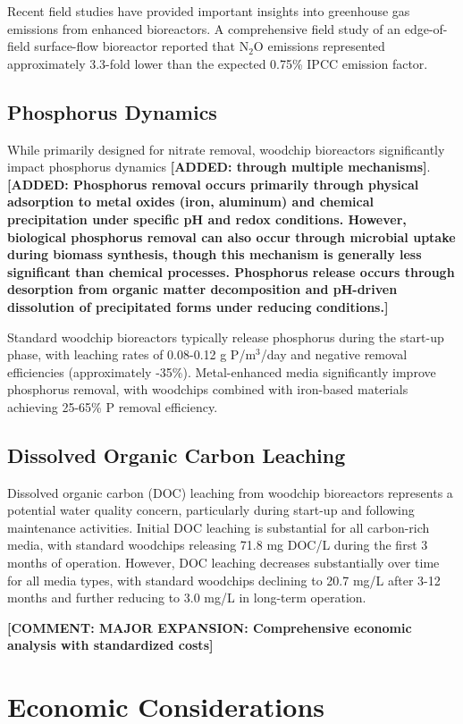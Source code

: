 \documentclass[12pt,a4paper]{article}
\newcommand{\added}[1]{\textcolor{addedtext}{\textbf{[ADDED: #1]}}}
\newcommand{\comment}[1]{\textcolor{commenttext}{\textbf{[COMMENT: #1]}}}
\begin{document}
Recent field studies have provided important insights into greenhouse gas emissions from enhanced bioreactors. A comprehensive field study of an edge-of-field surface-flow bioreactor reported that N$_2$O emissions represented approximately 3.3-fold lower than the expected 0.75\% IPCC emission factor.

\subsection{Phosphorus Dynamics}

While primarily designed for nitrate removal, woodchip bioreactors significantly impact phosphorus dynamics \added{through multiple mechanisms}. \added{Phosphorus removal occurs primarily through physical adsorption to metal oxides (iron, aluminum) and chemical precipitation under specific pH and redox conditions. However, biological phosphorus removal can also occur through microbial uptake during biomass synthesis, though this mechanism is generally less significant than chemical processes. Phosphorus release occurs through desorption from organic matter decomposition and pH-driven dissolution of precipitated forms under reducing conditions.}

Standard woodchip bioreactors typically release phosphorus during the start-up phase, with leaching rates of 0.08-0.12 g P/m$^3$/day and negative removal efficiencies (approximately -35\%). Metal-enhanced media significantly improve phosphorus removal, with woodchips combined with iron-based materials achieving 25-65\% P removal efficiency.

\subsection{Dissolved Organic Carbon Leaching}

Dissolved organic carbon (DOC) leaching from woodchip bioreactors represents a potential water quality concern, particularly during start-up and following maintenance activities. Initial DOC leaching is substantial for all carbon-rich media, with standard woodchips releasing 71.8 mg DOC/L during the first 3 months of operation. However, DOC leaching decreases substantially over time for all media types, with standard woodchips declining to 20.7 mg/L after 3-12 months and further reducing to 3.0 mg/L in long-term operation.

\comment{MAJOR EXPANSION: Comprehensive economic analysis with standardized costs}

\section{Economic Considerations}
\end{document}

